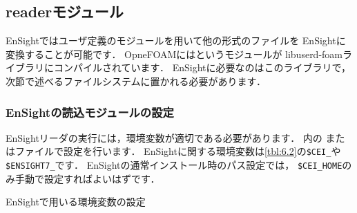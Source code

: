 \subsection{ readerモジュール}
\label{ssec:6.4.2}
%
%
EnSightではユーザ定義のモジュールを用いて他の形式のファイルを
EnSightに変換することが可能です．
OpneFOAMにはというモジュールが
libuserd-foamライブラリにコンパイルされています．
EnSightに必要なのはこのライブラリで，
次節で述べるファイルシステムに置かれる必要があります．

\subsubsection{EnSightの読込モジュールの設定}
\label{sssec:6.4.2.1}
EnSightリーダの実行には，環境変数が適切である必要があります．
内の
またはファイルで設定を行います．
EnSightに関する環境変数は\autoref{tbl:6.2}の\verb|$CEI_|や\verb|$ENSIGHT7_|です．
EnSightの通常インストール時のパス設定では，
\verb|$CEI_HOME|のみ手動で設定すればよいはずです．%


\begin{table}[ht]
 
 \caption{EnSightで用いる環境変数の設定}
 \label{tbl:6.2}
\end{table}



